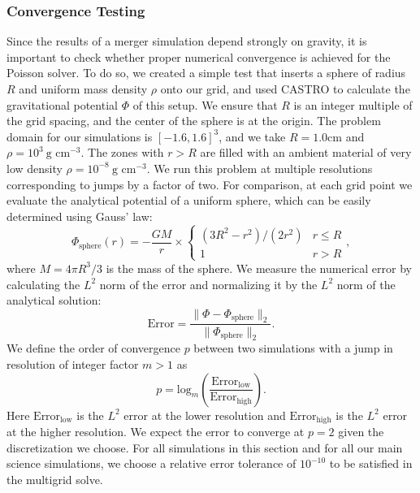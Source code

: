 \documentclass[iop]{../emulateapj}
\begin{document}
\subsubsection{Convergence Testing}\label{sec:gravity_convergence_testing}

Since the results of a merger simulation depend strongly on gravity,
it is important to check whether proper numerical convergence is
achieved for the Poisson solver. To do so, we created a simple test
that inserts a sphere of radius $R$ and uniform mass density $\rho$
onto our grid, and used CASTRO to calculate the gravitational
potential $\Phi$ of this setup. We ensure that $R$ is an integer
multiple of the grid spacing, and the center of the sphere is at the
origin. The problem domain for our simulations is $[-1.6, 1.6]^3$, and
we take $R = 1.0 \text{cm}$ and $\rho = 10^3\ \text{g cm}^{-3}$. 
The zones with $r > R$ are filled with an ambient material of very low density 
$\rho = 10^{-8}\ \text{g cm}^{-3}$. We run this problem at multiple 
resolutions corresponding to jumps by a factor of two. For
comparison, at each grid point we evaluate the analytical potential of
a uniform sphere, which can be easily determined using Gauss' law:
\begin{equation}
  \Phi_{\text{sphere}}(r) = -\frac{GM}{r} \times \begin{cases} (3R^2 - r^2)/(2 r^2) & r \leq R \\ 1 & r > R \end{cases},\label{eq:sphere-analytical}
\end{equation}
where $M = 4\pi R^3 / 3$ is the mass of the sphere. We measure the 
numerical error by calculating the $L^2$ norm of the error and 
normalizing it by the $L^2$ norm of the analytical solution:
\begin{equation}
  \text{Error} = \frac{\|\Phi - \Phi_{\text{sphere}}\|_2}{\|\Phi_{\text{sphere}}\|_2}.
\end{equation}
We define the order of convergence $p$ between two simulations with a jump 
in resolution of integer factor $m > 1$ as
\begin{equation}
  p = \text{log}_{m}\left(\frac{\text{Error}_{\text{low}}}{\text{Error}_{\text{high}}}\right).
\end{equation}
Here $\text{Error}_{\text{low}}$ is the $L^2$ error at the lower resolution 
and $\text{Error}_{\text{high}}$ is the $L^2$ error at the higher resolution.
We expect the error to converge at $p = 2$ given the discretization we choose. 
For all simulations in this section and for all our main science simulations,
we choose a relative error tolerance of $10^{-10}$ to be satisfied in the multigrid solve.
\end{document}
